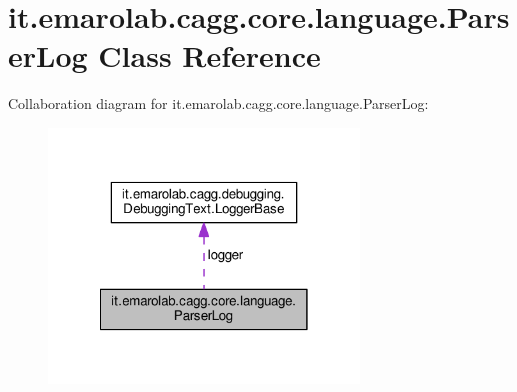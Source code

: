 \hypertarget{classit_1_1emarolab_1_1cagg_1_1core_1_1language_1_1ParserLog}{\section{it.\-emarolab.\-cagg.\-core.\-language.\-Parser\-Log Class Reference}
\label{classit_1_1emarolab_1_1cagg_1_1core_1_1language_1_1ParserLog}
}


Collaboration diagram for it.\-emarolab.\-cagg.\-core.\-language.\-Parser\-Log\-:\nopagebreak
\begin{figure}[H]
\begin{center}
\leavevmode
\includegraphics[width=234pt]{classit_1_1emarolab_1_1cagg_1_1core_1_1language_1_1ParserLog__coll__graph}
\end{center}
\end{figure}
